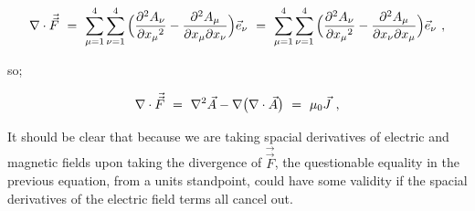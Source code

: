 \documentclass{article}
\begin{document}
\begin{equation} \label{eq:1002}
\nabla \cdot \vec{\vec{F}} \hspace{0.125cm} = \hspace{0.125cm} \sum_{\mu = 1}^{4} \sum_{\nu = 1}^{4} \Big( \frac{\partial^2 A_{\nu}}{\partial{x_{\mu}}^2} - \frac{\partial^2 {A_{\mu}}}{\partial{x_{\mu}}\partial{x_{\nu}}} \Big) \vec{e}_{\nu} \hspace{0.125cm} = \hspace{0.125cm} \sum_{\mu = 1}^{4} \sum_{\nu = 1}^{4} \Big( \frac{\partial^2 A_{\nu}}{\partial{x_{\mu}}^2} - \frac{\partial^2 {A_{\mu}}}{\partial{x_{\nu}}\partial{x_{\mu}}} \Big) \vec{e}_{\nu} \hspace{0.125cm} ,
\end{equation}

so;

\begin{equation} \label{eq:1002}
\nabla \cdot \vec{\vec{F}} \hspace{0.125cm} = \hspace{0.125cm} \nabla^2 \vec{A} - \nabla \big( \nabla \cdot \vec{A} \big) \hspace{0.125cm} = \hspace{0.125cm} \mu_0 \vec{J} \hspace{0.125cm} ,
\end{equation}

It should be clear that because we are taking spacial derivatives of electric and magnetic fields upon taking the divergence of \begin{math} \vec{\vec{F}} \end{math}, the questionable equality in the previous equation, from a units standpoint, could have some validity if the spacial derivatives of the electric field terms all cancel out. 
\end{document}

